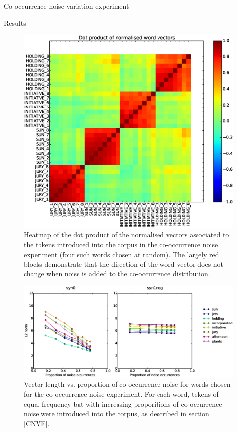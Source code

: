 \documentclass{article} %
\begin{document}
\begin{section}{Co-occurrence noise variation experiment}
\begin{subsection}{Results}
\begin{figure}
	\includegraphics[scale=0.5]{cooccurrence-noise-heatmap}
	\caption{
	Heatmap of the dot product of the normalised vectors associated to the
	tokens introduced into the corpus in the co-occurrence noise experiment
	(four such words chosen at random).  The largely red blocks demonstrate
	that the direction of the word vector does not change when noise is
	added to the co-occurrence distribution.
	}
	\label{fig:cooccurrence-noise-heatmap}
\end{figure}

\begin{figure}\label{fig:cooccurrence-noise-graph}
	\includegraphics[scale=0.6]{cooccurrence-noise-graph}
	\caption{
	Vector length vs. proportion of co-occurrence noise for words
	chosen for the co-occurrence noise experiment.  For each word,
	tokens of equal frequency but with increasing proporitions of
	co-occurrence noise were introduced into the corpus, as
	described in section \ref{CNVE}.
	}
\end{figure}

\end{subsection}

\end{section}
\end{document}
